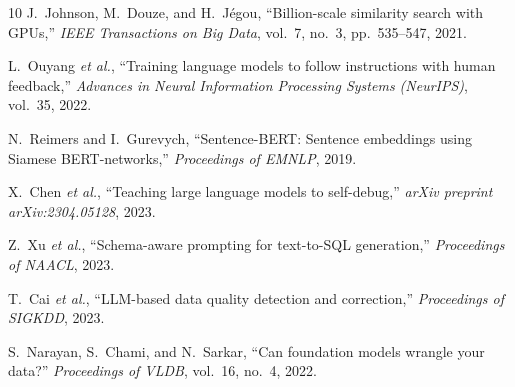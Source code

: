 \documentclass[conference]{IEEEtran}
\begin{document}
\begin{thebibliography}{10}
J.~Johnson, M.~Douze, and H.~J\'{e}gou,
``Billion-scale similarity search with GPUs,''
\textit{IEEE Transactions on Big Data}, vol.~7, no.~3, pp.~535--547, 2021.

L.~Ouyang \textit{et al.},
``Training language models to follow instructions with human feedback,''
\textit{Advances in Neural Information Processing Systems (NeurIPS)},
vol.~35, 2022.

N.~Reimers and I.~Gurevych,
``Sentence-BERT: Sentence embeddings using Siamese BERT-networks,''
\textit{Proceedings of EMNLP}, 2019.

X.~Chen \textit{et al.},
``Teaching large language models to self-debug,''
\textit{arXiv preprint arXiv:2304.05128}, 2023.

Z.~Xu \textit{et al.},
``Schema-aware prompting for text-to-SQL generation,''
\textit{Proceedings of NAACL}, 2023.

T.~Cai \textit{et al.},
``LLM-based data quality detection and correction,''
\textit{Proceedings of SIGKDD}, 2023.

S.~Narayan, S.~Chami, and N.~Sarkar,
``Can foundation models wrangle your data?''
\textit{Proceedings of VLDB}, vol.~16, no.~4, 2022.

\end{thebibliography}

\balance
\end{document}
